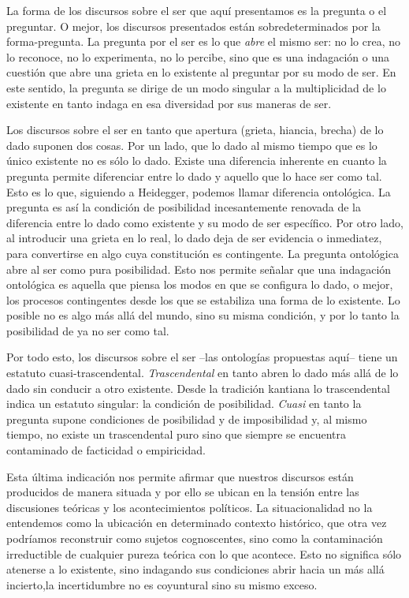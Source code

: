 \documentclass{book}
\begin{document}
La forma de los discursos sobre el ser que aquí presentamos es la
pregunta o el preguntar. O mejor, los discursos presentados están
sobredeterminados por la forma-pregunta. La pregunta por el ser es lo
que \emph{abre} el mismo ser: no lo crea, no lo reconoce, no lo
experimenta, no lo percibe, sino que es una indagación o una cuestión
que abre una grieta en lo existente al preguntar por su modo de ser. En
este sentido, la pregunta se dirige de un modo singular a la
multiplicidad de lo existente en tanto indaga en esa diversidad por sus
maneras de ser.

Los discursos sobre el ser en tanto que apertura (grieta, hiancia,
brecha) de lo dado suponen dos cosas. Por un lado, que lo dado al mismo
tiempo que es lo único existente no es sólo lo dado. Existe una
diferencia inherente en cuanto la pregunta permite diferenciar entre lo
dado y aquello que lo hace ser como tal. Esto es lo que, siguiendo a
Heidegger, podemos llamar diferencia ontológica. La pregunta es así la
condición de posibilidad incesantemente renovada de la diferencia entre
lo dado como existente y su modo de ser específico. Por otro lado, al
introducir una grieta en lo real, lo dado deja de ser evidencia o
inmediatez, para convertirse en algo cuya constitución es contingente.
La pregunta ontológica abre al ser como pura posibilidad. Esto nos
permite señalar que una indagación ontológica es aquella que piensa los
modos en que se configura lo dado, o mejor, los procesos contingentes
desde los que se estabiliza una forma de lo existente. Lo posible no es
algo más allá del mundo, sino su misma condición, y por lo tanto la
posibilidad de ya no ser como tal.

Por todo esto, los discursos sobre el ser --las ontologías propuestas
aquí-- tiene un estatuto cuasi-trascendental. \emph{Trascendental} en
tanto abren lo dado más allá de lo dado sin conducir a otro existente.
Desde la tradición kantiana lo trascendental indica un estatuto
singular: la condición de posibilidad. \emph{Cuasi} en tanto la pregunta
supone condiciones de posibilidad y de imposibilidad y, al mismo tiempo,
no existe un trascendental puro sino que siempre se encuentra
contaminado de facticidad o empiricidad.

Esta última indicación nos permite afirmar que nuestros discursos están
producidos de manera situada y por ello se ubican en la tensión entre
las discusiones teóricas y los acontecimientos políticos. La
situacionalidad no la entendemos como la ubicación en determinado
contexto histórico, que otra vez podríamos reconstruir como sujetos
cognoscentes, sino como la contaminación irreductible de cualquier
pureza teórica con lo que acontece. Esto no significa sólo atenerse a lo
existente, sino indagando sus condiciones abrir hacia un más allá
incierto,la incertidumbre no es coyuntural sino su mismo exceso.
\end{document}
